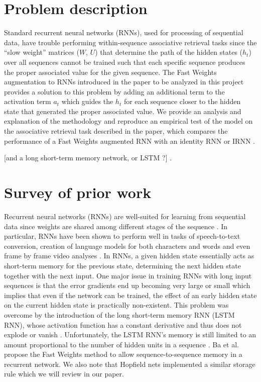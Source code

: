 \section{Problem description}

Standard recurrent neural networks (RNNs), used for processing of sequential data, have trouble performing within-sequence associative retrieval tasks since the ``slow weight'' matrices ($W$, $U$) that determine the path of the hidden states ($h_t$) over all sequences cannot be trained such that each specific sequence produces the proper associated value for the given sequence. The Fast Weights augmentation to RNNs introduced in the paper to be analyzed in this project \cite{DBLP:conf/nips/BaHMLI16} provides a solution to this problem by adding an additional term to the activation term $a_t$ which guides the $h_t$ for each sequence closer to the hidden state that generated the proper associated value. We provide an analysis and explanation of the methodology and reproduce an empirical test of the model on the associative retrieval task described in the paper, which compares the performance of a Fast Weights augmented RNN with an identity RNN or IRNN \cite{DBLP:journals/corr/LeJH15}.

[and a long short-term memory network, or LSTM ?] \cite{DBLP:journals/neco/HochreiterS97}.

\section{Survey of prior work}

Recurrent neural networks (RNNs) are well-suited for learning from sequential data since weights are shared among different stages of the sequence \cite[p. 373]{Goodfellow-et-al-2016}. In particular, RNNs have been shown to perform well in tasks of speech-to-text conversion, creation of language models for both characters and words \cite{DBLP:conf/icml/SutskeverMH11} and even frame by frame video analyses \cite{mnih}. In RNNs, a given hidden state essentially acts as short-term memory for the previous state, determining the next hidden state together with the next input. One major issue in training RNNs with long input sequences is that the error gradients end up becoming very large or small \cite[p. 16]{DBLP:journals/nn/Schmidhuber15} which implies that even if the network can be trained, the effect of an early hidden state on the current hidden state is practically non-existent. This problem was overcome by the introduction of the long short-term memory RNN (LSTM RNN), whose activation function has a constant derivative and thus does not explode or vanish \cite[p. 19]{DBLP:journals/nn/Schmidhuber15}. Unfortunately, the LSTM RNN's memory is still limited to an amount proportional to the number of hidden units in a sequence \cite[p. 1]{DBLP:conf/nips/BaHMLI16}. Ba et al. propose the Fast Weights method to allow sequence-to-sequence memory in a recurrent network. We also note that Hopfield nets \cite{MacKay:2002:ITI:971143} implemented a similar storage rule \cite[p. 2]{DBLP:conf/nips/BaHMLI16} which we will review in our paper.


